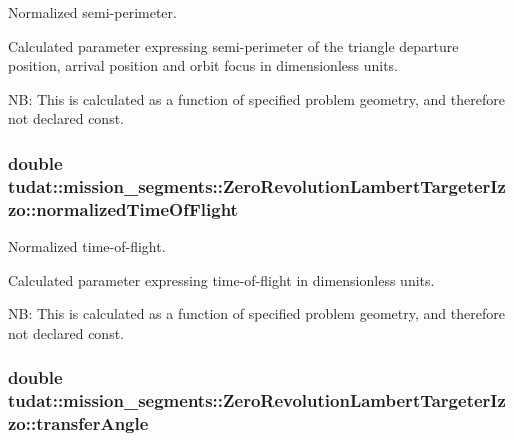 Normalized semi-\/perimeter. 

Calculated parameter expressing semi-\/perimeter of the triangle departure position, arrival position and orbit focus in dimensionless units.

NB\+: This is calculated as a function of specified problem geometry, and therefore not declared const. 
\subsubsection[{\texorpdfstring{normalized\+Time\+Of\+Flight}{normalizedTimeOfFlight}}]{\setlength{\rightskip}{0pt plus 5cm}double tudat\+::mission\+\_\+segments\+::\+Zero\+Revolution\+Lambert\+Targeter\+Izzo\+::normalized\+Time\+Of\+Flight\hspace{0.3cm}{\ttfamily [protected]}}\hypertarget{classtudat_1_1mission__segments_1_1ZeroRevolutionLambertTargeterIzzo_ab55d302f257841e2f4caf7e52f8955c4}{}\label{classtudat_1_1mission__segments_1_1ZeroRevolutionLambertTargeterIzzo_ab55d302f257841e2f4caf7e52f8955c4}


Normalized time-\/of-\/flight. 

Calculated parameter expressing time-\/of-\/flight in dimensionless units.

NB\+: This is calculated as a function of specified problem geometry, and therefore not declared const. 
\subsubsection[{\texorpdfstring{transfer\+Angle}{transferAngle}}]{\setlength{\rightskip}{0pt plus 5cm}double tudat\+::mission\+\_\+segments\+::\+Zero\+Revolution\+Lambert\+Targeter\+Izzo\+::transfer\+Angle\hspace{0.3cm}{\ttfamily [protected]}}\hypertarget{classtudat_1_1mission__segments_1_1ZeroRevolutionLambertTargeterIzzo_ad122718ab907efaf27eb18f4f15baabc}{}\label{classtudat_1_1mission__segments_1_1ZeroRevolutionLambertTargeterIzzo_ad122718ab907efaf27eb18f4f15baabc}


